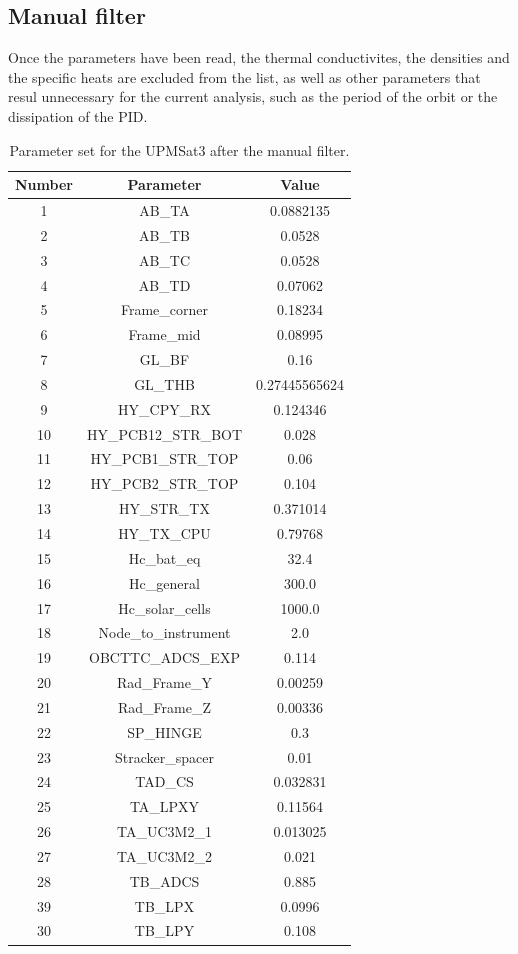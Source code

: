 \subsection{Manual filter}
Once the parameters have been read, the thermal conductivites, the densities and the specific heats are excluded from the list, as well as other parameters that resul unnecessary for the current analysis, such as the period of the orbit or the dissipation of the PID.
    \begin{table}[H]
        \centering
        \caption{Parameter set for the UPMSat3 after the manual filter.}
        \label{tab:manualfilterparamsUPMSat3}
    \begin{tabular}{ccc}
        \hline
        Number & Parameter & Value \\
        \hline
        1 & AB\_TA & 0.0882135 \\
        2 & AB\_TB & 0.0528 \\
        3 & AB\_TC & 0.0528 \\
        4 & AB\_TD & 0.07062 \\
        5 & Frame\_corner & 0.18234 \\
        6 & Frame\_mid & 0.08995 \\
        7 & GL\_BF & 0.16 \\
        8 & GL\_THB & 0.27445565624 \\
        9 & HY\_CPY\_RX & 0.124346 \\
        10 & HY\_PCB12\_STR\_BOT & 0.028 \\
        11 & HY\_PCB1\_STR\_TOP & 0.06 \\
        12 & HY\_PCB2\_STR\_TOP & 0.104 \\
        13 & HY\_STR\_TX & 0.371014 \\
        14 & HY\_TX\_CPU & 0.79768 \\
        15 & Hc\_bat\_eq & 32.4 \\
        16 & Hc\_general & 300.0 \\
        17 & Hc\_solar\_cells & 1000.0 \\
        18 & Node\_to\_instrument & 2.0 \\
        19 & OBCTTC\_ADCS\_EXP & 0.114 \\  
        20 & Rad\_Frame\_Y & 0.00259 \\
        21 & Rad\_Frame\_Z & 0.00336 \\
        22 & SP\_HINGE & 0.3 \\
        23 & Stracker\_spacer & 0.01 \\
        24 & TAD\_CS & 0.032831 \\
        25 & TA\_LPXY & 0.11564 \\
        26 & TA\_UC3M2\_1 & 0.013025 \\
        27 & TA\_UC3M2\_2 & 0.021 \\
        28 & TB\_ADCS & 0.885 \\
        39 & TB\_LPX & 0.0996 \\
        30 & TB\_LPY & 0.108 \\
        \bottomrule
        \end{tabular}
    \end{table}


